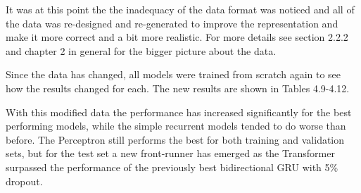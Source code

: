\documentclass[bsc,frontabs,singlespacing,parskip,deptreport]{infthesis}
\begin{document}
\begin{table}
\begin{center}
\caption{AUC metric performance when training time was doubled.}
\end{center}
\vskip -3mm
\end{table}


It was at this point the the inadequacy of the data format was noticed and all of the data was re-designed and re-generated to improve the representation and make it more correct and a bit more realistic. For more details see section 2.2.2 and chapter 2 in general for the bigger picture about the data.

Since the data has changed, all models were trained from scratch again to see how the results changed for each. The new results are shown in Tables 4.9-4.12.

With this modified data the performance has increased significantly for the best performing models, while the simple recurrent models tended to do worse than before. The Perceptron still performs the best for both training and validation sets, but for the test set a new front-runner has emerged as the Transformer surpassed the performance of the previously best bidirectional GRU with 5\% dropout.
\end{document}
